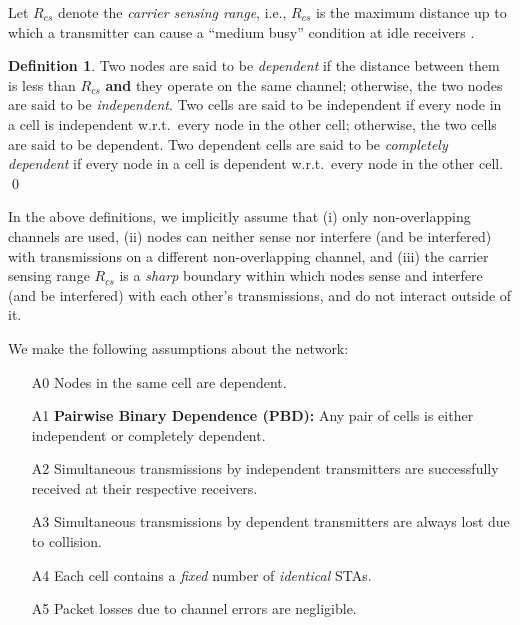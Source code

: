 \documentclass[10pt,a4paper,journal]{IEEEtran}
\theoremstyle{definition}
\newtheorem{definition}{Definition}[section]
\theoremstyle{remark}
\theoremstyle{plain}
\begin{document}
Let $R_{cs}$ denote the \textit{carrier sensing range}, i.e., $R_{cs}$ is the maximum distance up to which a transmitter can cause a ``medium busy'' condition at idle receivers \cite{wanet.roy_etal09ToN-PCS,wanet.liew_etal09mobicom-capacity-wireless-networks}. 

\begin{definition}
\label{defn:dependence}
Two nodes are said to be \textit{dependent} if the distance between them is less than $R_{cs}$ \textbf{and} they operate on the same channel; otherwise, the two nodes are said to be \textit{independent}. Two cells are said to be independent if every node in a cell is independent w.r.t.~every node in the other cell; otherwise, the two cells are said to be dependent. Two dependent cells are said to be \textit{completely dependent} if every node in a cell is dependent w.r.t.~every node in the other cell. \hfill \qed
\end{definition}

In the above definitions, we implicitly assume that (i) only non-overlapping channels are used, (ii) nodes can neither sense nor interfere (and be interfered) with transmissions on a different non-overlapping channel, and (iii) the carrier sensing range $R_{cs}$ is a \textit{sharp} boundary within which nodes sense and interfere (and be interfered) with each other's transmissions, and do not interact outside of it. 

We make the following assumptions about the network:
\begin{itemize}

\item [A0] Nodes in the same cell are dependent. 

\item [A1] \textbf{Pairwise Binary Dependence (PBD):} Any pair of cells is either independent or completely dependent. 

\item [A2] Simultaneous transmissions by independent transmitters are successfully received at their respective receivers. 

\item [A3] Simultaneous transmissions by dependent transmitters are always lost due to collision. 

\item [A4] Each cell contains a \textit{fixed} number of \textit{identical} STAs. 

\item [A5] Packet losses due to channel errors are negligible.

\end{itemize}
\end{document}
